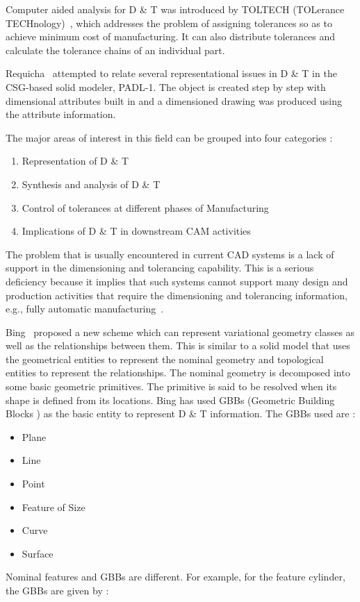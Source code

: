     Computer aided analysis for D \& T was introduced by TOLTECH (TOLerance 
	TECHnology)~\cite{Bjork}, which addresses the problem of assigning 
	tolerances so as to achieve minimum cost of manufacturing. It can also 
	distribute tolerances and calculate the tolerance chains of an individual 
	part.
 
 
    Requicha~\cite{Requi85} attempted to relate several representational
	issues in D \& T in the CSG-based solid modeler, PADL-1. The object is 
	created step by step with dimensional attributes built in and a dimensioned 	drawing was produced using the attribute information.
 
        The major areas of interest in this field can be grouped into four 
	categories :

		\begin{enumerate}
		\item
        Representation of D \& T
		\item
        Synthesis and analysis of D \& T
		\item
        Control of tolerances at different phases of Manufacturing
		\item
        Implications of D \& T in downstream CAM activities
		\end{enumerate}
 
        The problem that is usually encountered in current CAD systems is a lack		of support in the dimensioning and tolerancing capability. 
		This is a serious deficiency because it implies that such systems 
		cannot support many design and production activities that require the 
		dimensioning and tolerancing information, e.g., fully automatic 
		manufacturing~\cite{Req83}.


    	Bing~\cite{Bing} proposed a new scheme which can represent 
		variational geometry classes as well as the relationships between them.
		This is similar to a solid model that uses the geometrical entities to 
		represent the nominal geometry and topological entities to represent 
		the relationships.
        The nominal geometry is decomposed into some basic geometric primitives.
		The primitive is said to be resolved when its shape is defined from its 
		locations. Bing has used GBBs (Geometric Building Blocks ) as the basic 
		entity to represent D \& T information. The GBBs used are :

			\begin{itemize}
			\item
            Plane 
			\item
			Line
			\item
			Point
			\item
			Feature of Size
			\item
			Curve 
			\item
			Surface
			\end{itemize}
			Nominal features and GBBs are different. For example, for the
			feature cylinder, the GBBs are given by :

